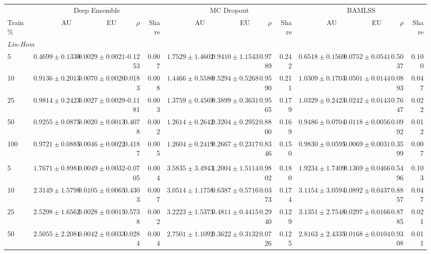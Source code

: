 \begin{tabular}{lrrrrrrrrrrrr}
\toprule
 & \multicolumn{4}{c}{Deep Ensemble} & \multicolumn{4}{c}{MC Dropout} & \multicolumn{4}{c}{BAMLSS} \\
\cmidrule(lr){2-5} \cmidrule(lr){6-9} \cmidrule(lr){10-13}
Train \% & AU & EU & $\rho$ & Share & AU & EU & $\rho$ & Share & AU & EU & $\rho$ & Share \\
\midrule
\multicolumn{13}{l}{\textit{Lin-Hom}} \\
5 & $0.4699 \pm 0.1330$ & $0.0029 \pm 0.0021$ & -0.1253 & 0.007 & $1.7529 \pm 1.4602$ & $0.9410 \pm 1.1543$ & 0.9789 & 0.242 & $0.6518 \pm 0.1569$ & $0.0752 \pm 0.0541$ & 0.5037 & 0.100 \\
10 & $0.9136 \pm 0.2013$ & $0.0070 \pm 0.0026$ & 0.0183 & 0.008 & $1.4466 \pm 0.5580$ & $0.5294 \pm 0.5268$ & 0.9590 & 0.211 & $1.0309 \pm 0.1703$ & $0.0501 \pm 0.0144$ & 0.0893 & 0.047 \\
25 & $0.9814 \pm 0.2423$ & $0.0027 \pm 0.0029$ & -0.1181 & 0.003 & $1.3759 \pm 0.4569$ & $0.3899 \pm 0.3631$ & 0.9565 & 0.179 & $1.0329 \pm 0.2423$ & $0.0242 \pm 0.0143$ & 0.7647 & 0.022 \\
50 & $0.9255 \pm 0.0875$ & $0.0020 \pm 0.0013$ & 0.4078 & 0.002 & $1.2614 \pm 0.2642$ & $0.3204 \pm 0.2952$ & 0.8800 & 0.169 & $0.9486 \pm 0.0704$ & $0.0118 \pm 0.0056$ & 0.0992 & 0.012 \\
100 & $0.9721 \pm 0.0885$ & $0.0046 \pm 0.0022$ & 0.4187 & 0.005 & $1.2604 \pm 0.2419$ & $0.2667 \pm 0.2317$ & 0.8346 & 0.150 & $0.9830 \pm 0.0595$ & $0.0069 \pm 0.0031$ & 0.3599 & 0.007 \\
\addlinespace
\multicolumn{13}{l}{\textit{Lin-Het}} \\
5 & $1.7671 \pm 0.8981$ & $0.0049 \pm 0.0032$ & -0.0705 & 0.004 & $3.5835 \pm 3.4943$ & $1.2004 \pm 1.5114$ & 0.9802 & 0.180 & $1.9234 \pm 1.7409$ & $0.1369 \pm 0.0466$ & 0.5496 & 0.103 \\
10 & $2.3149 \pm 1.5798$ & $0.0105 \pm 0.0065$ & 0.4303 & 0.007 & $3.0514 \pm 1.1758$ & $0.6387 \pm 0.5716$ & 0.0373 & 0.174 & $3.1154 \pm 3.0594$ & $0.0892 \pm 0.0437$ & 0.8857 & 0.047 \\
25 & $2.5298 \pm 1.6562$ & $0.0028 \pm 0.0015$ & 0.5738 & 0.002 & $3.2223 \pm 1.5373$ & $0.4811 \pm 0.4415$ & 0.2940 & 0.129 & $3.1351 \pm 2.7548$ & $0.0297 \pm 0.0166$ & 0.8785 & 0.021 \\
50 & $2.5055 \pm 2.2081$ & $0.0042 \pm 0.0033$ & 0.0284 & 0.004 & $2.7501 \pm 1.1092$ & $0.3622 \pm 0.3132$ & 0.0726 & 0.125 & $2.8163 \pm 2.4335$ & $0.0168 \pm 0.0104$ & 0.9308 & 0.011 \\

\end{tabular}
